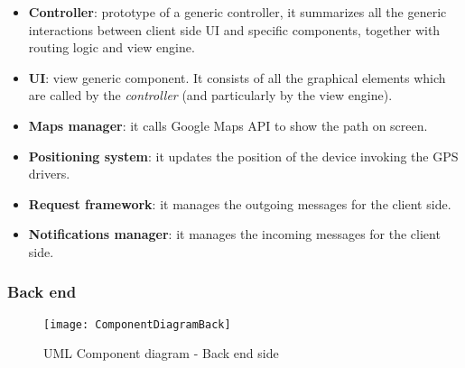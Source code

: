 \begin{itemize}
\item \textbf{Controller}: prototype of a generic controller, it summarizes all the generic interactions between client side UI and specific components, together with routing logic and view engine.

\item \textbf{UI}: view generic component. It consists of all the graphical elements which are called by the \textit{controller} (and particularly by the view engine).

\item \textbf{Maps manager}: it calls Google Maps API to show the path on screen.

\item \textbf{Positioning system}: it updates the position of the device invoking the GPS drivers.

\item \textbf{Request framework}: it manages the outgoing messages for the client side.

\item \textbf{Notifications manager}: it manages the incoming messages for the client side.
\end{itemize}

\subsubsection{Back end}

\begin{figure}[h!]
        \centering
        \texttt{[image: ComponentDiagramBack]}
        \caption{UML Component diagram - Back end side}
        \label{fig:ComponentBack}
\end{figure}

